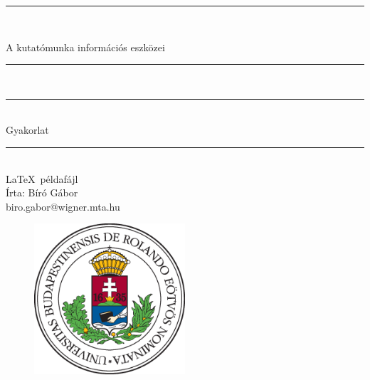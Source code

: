 \documentclass[a4paper, 12pt]{article}
\numberwithin{equation}{section}          %
\numberwithin{figure}{subsection}
\begin{document}
\begin{titlepage}   
\begin{center}
\thispagestyle{empty}  

\vspace*{0.7cm}
\rule{\linewidth}{0.5mm} \\[3mm]
\vspace*{0.7cm}

{\LARGE A kutatómunka információs eszközei}

\vspace*{0.7cm}
\rule{\linewidth}{0.5mm} \\[3mm]
\rule{\linewidth}{0.5mm} \\[3mm]



{\Large Gyakorlat\\}

\vspace*{0.7cm}
\rule{\linewidth}{0.5mm} \\[3mm]
  {\small \LaTeX\ példafájl} \\[3mm]
  \vspace*{1cm}
{\footnotesize Írta: Bíró Gábor} \\
{\tiny biro.gabor@wigner.mta.hu}

  \vspace*{2cm}

\begin{figure}[h!]
\begin{center}
\includegraphics[width=0.5\textwidth]{./elte.eps}
\end{center}
\end{figure}

\end{center}

\end{titlepage}
\end{document}
